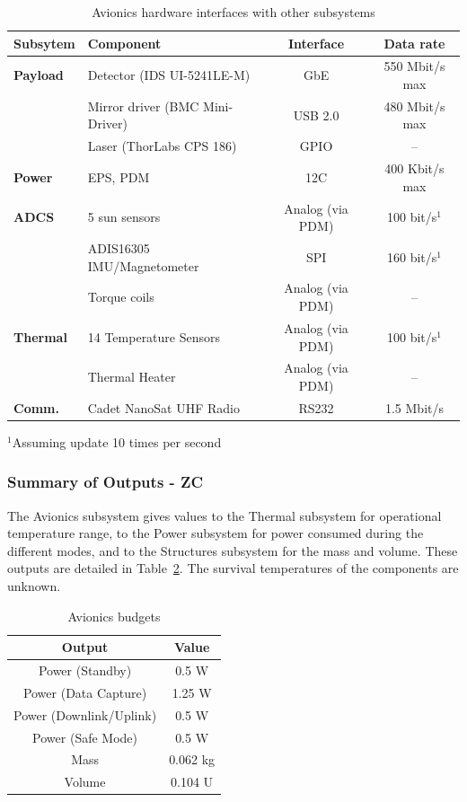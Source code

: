 \documentclass[12pt]{article}
\begin{document}
\begin{table}[ht]
\caption{Avionics hardware interfaces with other subsystems}
\label{table:avionics_interfaces}
\begin{center}
    \begin{tabular}{| p{2cm} | l | c | c |} \hline
    	\textbf{Subsytem} & \textbf{Component} & \textbf{Interface} & \textbf{Data rate} \\ \hline \hline
    \textbf{Payload} & Detector (IDS UI-5241LE-M) & GbE & 550 Mbit/s max  \\
     & Mirror driver (BMC Mini-Driver) & USB 2.0 & 480 Mbit/s max \\
     & Laser (ThorLabs CPS 186) & GPIO & -- \\ \hline
    \textbf{Power} & EPS, PDM & 12C & 400 Kbit/s max \\ \hline
    \textbf{ADCS} & 5 sun sensors & Analog (via PDM) & 100 bit/s$^1$ \\
     & ADIS16305 IMU/Magnetometer & SPI & 160 bit/s$^1$ \\
     & Torque coils & Analog (via PDM) & -- \\ \hline
    \textbf{Thermal} & 14 Temperature Sensors & Analog (via PDM) & 100 bit/s$^1$ \\
     & Thermal Heater & Analog (via PDM) & -- \\ \hline
    \textbf{Comm.} & Cadet NanoSat UHF Radio & RS232 & 1.5 Mbit/s \\ \hline 
    \end{tabular}
$^1$Assuming update 10 times per second
\end{center}
\end{table}

			\subsubsection{Summary of Outputs - ZC}

The Avionics subsystem gives values to the Thermal subsystem for operational temperature range, to the Power subsystem for power consumed during the different modes, and to the Structures subsystem for the mass and volume. These outputs are detailed in Table~\ref{table:avionics_summary_outputs}. The survival temperatures of the components are unknown.

\begin{table}[ht]
\caption{Avionics budgets}
\label{table:avionics_summary_outputs}
\begin{center}
    \begin{tabular}{|c||c|} \hline
    	\textbf{Output} & \textbf{Value} \\ \hline \hline
    Power (Standby) & 0.5 W  \\
    Power (Data Capture) & 1.25 W \\
    Power (Downlink/Uplink) & 0.5 W \\
    Power (Safe Mode) & 0.5 W \\
    Mass & 0.062 kg  \\
    Volume & 0.104 U \\ \hline 
    \end{tabular}
\end{center}
\end{table}
\end{document}
